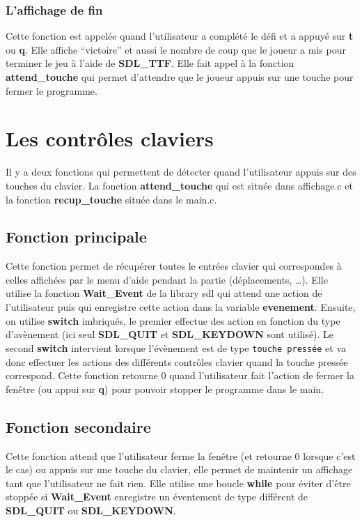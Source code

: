 \documentclass[a4paper]{article}
\begin{document}
\subsubsection{L'affichage de fin}

Cette fonction est appelée quand l'utilisateur a complété le défi et a appuyé
sur \textbf{t} ou \textbf{q}. Elle affiche ``victoire'' et aussi le nombre de
coup que le joueur a mis pour terminer le jeu à l'aide de \textbf{SDL\_TTF}. Elle fait
appel à la fonction \textbf{attend\_touche} qui permet d'attendre que le joueur
appuis sur une touche pour fermer le programme.

\section{Les contrôles claviers}

Il y a deux fonctions qui permettent de détecter quand l'utilisateur appuis sur
des touches du clavier. La fonction \textbf{attend\_touche} qui est située dans
affichage.c et la fonction \textbf{recup\_touche} située dans le main.c.

\subsection{Fonction principale}

Cette fonction permet de récupérer toutes le entrées clavier qui correspondes à
celles affichées par le menu d'aide pendant la partie (déplacements,
\dots). Elle utilise la fonction \textbf{Wait\_Event} de la library sdl qui
attend une action de l'utilisateur puis qui enregistre cette action dans la
variable \textbf{evenement}. Ensuite, on utilise \textbf{switch} imbriqués, le
premier effectue des action en fonction du type d’avènement (ici seul
\textbf{SDL\_QUIT} et \textbf{SDL\_KEYDOWN} sont utilisé). Le second
\textbf{switch} intervient lorsque l'évènement est de type \texttt{touche
  pressée} et va donc effectuer les actions des différents contrôles clavier
quand la touche pressée correspond. Cette fonction retourne 0 quand
l'utilisateur fait l'action de fermer la fenêtre (ou appui sur \textbf{q}) pour
pouvoir stopper le programme dans le main.

\subsection{Fonction secondaire}

Cette fonction attend que l'utilisateur ferme la fenêtre (et retourne 0 lorsque
c'est le cas) ou appuis sur une touche du clavier, elle permet de maintenir un
affichage tant que l'utilisateur ne fait rien. Elle utilise une boucle
\textbf{while} pour éviter d'être stoppée si \textbf{Wait\_Event} enregistre un
éventement de type différent de \textbf{SDL\_QUIT} ou \textbf{SDL\_KEYDOWN}.
\end{document}
